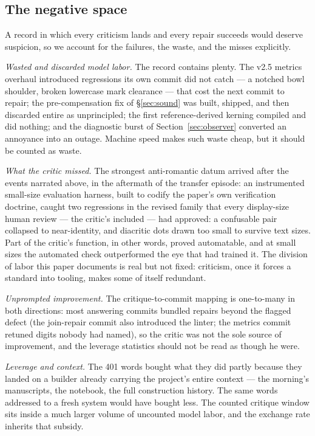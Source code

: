 \documentclass[12pt]{article}
\begin{document}
\subsection{The negative space}\label{sec:negative}

A record in which every criticism lands and every repair succeeds would deserve suspicion, so we account for the failures, the waste, and the misses explicitly.

\emph{Wasted and discarded model labor.} The record contains plenty. The v2.5 metrics overhaul introduced regressions its own commit did not catch — a notched bowl shoulder, broken lowercase mark clearance — that cost the next commit to repair; the pre-compensation fix of \S\ref{sec:sound} was built, shipped, and then discarded entire as unprincipled; the first reference-derived kerning compiled and did nothing; and the diagnostic burst of Section~\ref{sec:observer} converted an annoyance into an outage. Machine speed makes such waste cheap, but it should be counted as waste.

\emph{What the critic missed.} The strongest anti-romantic datum arrived after the events narrated above, in the aftermath of the transfer episode: an instrumented small-size evaluation harness, built to codify the paper's own verification doctrine, caught two regressions in the revised family that every display-size human review — the critic's included — had approved: a confusable pair collapsed to near-identity, and diacritic dots drawn too small to survive text sizes. Part of the critic's function, in other words, proved automatable, and at small sizes the automated check outperformed the eye that had trained it. The division of labor this paper documents is real but not fixed: criticism, once it forces a standard into tooling, makes some of itself redundant.

\emph{Unprompted improvement.} The critique-to-commit mapping is one-to-many in both directions: most answering commits bundled repairs beyond the flagged defect (the join-repair commit also introduced the linter; the metrics commit retuned digits nobody had named), so the critic was not the sole source of improvement, and the leverage statistics should not be read as though he were.

\emph{Leverage and context.} The 401 words bought what they did partly because they landed on a builder already carrying the project's entire context — the morning's manuscripts, the notebook, the full construction history. The same words addressed to a fresh system would have bought less. The counted critique window sits inside a much larger volume of uncounted model labor, and the exchange rate inherits that subsidy.
\end{document}
